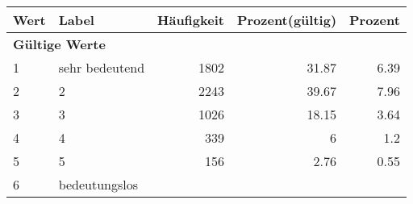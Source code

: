      \begin{longtable}{lXrrr}
     \toprule
     \textbf{Wert} & \textbf{Label} & \textbf{Häufigkeit} & \textbf{Prozent(gültig)} & \textbf{Prozent} \\
     \endhead
     \midrule
     \multicolumn{5}{l}{\textbf{Gültige Werte}}\\

     1 &
     \multicolumn{1}{X}{ sehr bedeutend   } &


       \num{1802} &
       \num[round-mode=places,round-precision=2]{31.87} &
         \num[round-mode=places,round-precision=2]{6.39} \\

     2 &
     \multicolumn{1}{X}{ 2   } &


       \num{2243} &
       \num[round-mode=places,round-precision=2]{39.67} &
         \num[round-mode=places,round-precision=2]{7.96} \\

     3 &
     \multicolumn{1}{X}{ 3   } &


       \num{1026} &
       \num[round-mode=places,round-precision=2]{18.15} &
         \num[round-mode=places,round-precision=2]{3.64} \\

     4 &
     \multicolumn{1}{X}{ 4   } &


       \num{339} &
       \num[round-mode=places,round-precision=2]{6} &
         \num[round-mode=places,round-precision=2]{1.2} \\

     5 &
     \multicolumn{1}{X}{ 5   } &


       \num{156} &
       \num[round-mode=places,round-precision=2]{2.76} &
         \num[round-mode=places,round-precision=2]{0.55} \\

     6 &
     \multicolumn{1}{X}{ bedeutungslos   } &



\end{longtable}
